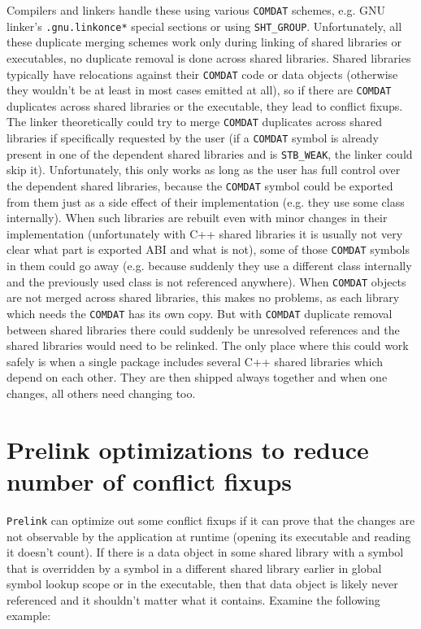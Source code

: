 \documentclass[twoside]{article}
\def\tts#1{\texttt{\small #1}}
\begin{document}
\begin{itemize}
Compilers and linkers handle these using various \tts{COMDAT} schemes,
e.g. GNU linker's \tts{.gnu.linkonce*} special sections or using
\tts{SHT\_GROUP}.  Unfortunately, all these duplicate merging schemes
work only during linking of shared libraries or executables, no duplicate
removal is done across shared libraries.  Shared libraries typically
have relocations against their \tts{COMDAT} code or data objects (otherwise
they wouldn't be at least in most cases emitted at all), so if there are
\tts{COMDAT} duplicates across shared libraries or the executable, they
lead to conflict fixups.  The linker theoretically could try to
merge \tts{COMDAT} duplicates across shared libraries if specifically
requested by the user (if a \tts{COMDAT} symbol is already present in
one of the dependent shared libraries and is \tts{STB\_WEAK}, the linker
could skip it).  Unfortunately, this only works as long as the user has
full control over the dependent shared libraries, because the \tts{COMDAT}
symbol could be exported from them just as a side effect of their
implementation (e.g. they use some class internally).  When such libraries
are rebuilt even with minor changes in their implementation (unfortunately
with C++ shared libraries it is usually not very clear what part is exported
ABI and what is not), some of those \tts{COMDAT} symbols in them could go
away (e.g. because suddenly they use a different class internally and
the previously used class is not referenced anywhere).  When \tts{COMDAT}
objects are not merged across shared libraries, this makes no problems,
as each library which needs the \tts{COMDAT} has its own copy.  But with
\tts{COMDAT} duplicate removal between shared libraries there could suddenly
be unresolved references and the shared libraries would need to be relinked.
The only place where this could work safely is when a single package
includes several C++ shared libraries which depend on each other.  They are
then shipped always together and when one changes, all others need changing
too.
\end{itemize}

\section{Prelink optimizations to reduce number of conflict fixups}

\tts{Prelink} can optimize out some conflict fixups if it can prove that
the changes are not observable by the application at runtime (opening its
executable and reading it doesn't count).  If there is a data object in some
shared library with a symbol that is overridden by a symbol in a different
shared library earlier in global symbol lookup scope or in the executable, then
that data object is likely never referenced and it shouldn't matter what it
contains.  Examine the following example:
\end{document}
